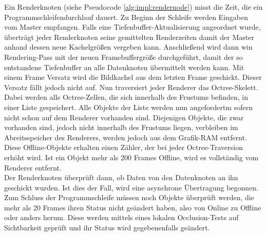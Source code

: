 Ein Renderknoten (siehe Pseudocode \ref{alg:impl:rendernode}) misst die Zeit, die ein Programmschleifendurchlauf dauert. Zu Beginn der Schleife werden Eingaben vom Master empfangen. Falls eine Tiefenbuffer-Aktualisierung angeordnet wurde, überträgt jeder Renderknoten seine gemittelten Renderzeiten damit der Master anhand dessen neue Kachelgrößen vergeben kann. Anschließend wird dann win Rendering-Pass mit der neuen Framebuffergröße durchgeführt, damit der so entstandene Tiefenbuffer an alle Datenknoten übermittelt werden kann. Mit einem Frame Versatz wird die Bildkachel aus dem letzten Frame geschickt. Dieser Versatz fällt jedoch nicht auf. Nun traversiert jeder Renderer das Octree-Skelett. Dabei werden alle Octree-Zellen, die sich innerhalb des Frustums befinden, in einer Liste gespeichert. Alle Objekte der Liste werden nun angefordertm sofern nicht schon auf dem Renderer vorhanden sind. Diejenigen Objekte, die zwar vorhanden sind, jedoch nicht innerhalb des Frustums liegen, verbleiben im Abreitsspeicher des Renderers, werden jedoch aus dem Grafik-RAM entfernt. Diese Offline-Objekte erhalten einen Zähler, der bei jeder Octree-Traversion erhöht wird. Ist ein Objekt mehr als 200 Frames Offline, wird es vollständig vom Renderer entfernt.\\
Der Renderknoten überprüft dann, ob Daten von den Datenknoten an ihn geschickt wurden. Ist dies der Fall, wird eine asynchrone Übertragung begonnen. Zum Schluss der Programmschleife müssen noch Objekte überprüft werden, die mehr als 20 Frames ihren Status nicht geändert haben, also von Online zu Offline oder anders herum. Diese werden mittels eines lokalen Occlusion-Tests auf Sichtbarkeit geprüft und ihr Status wird gegebenenfalls geändert.
 
